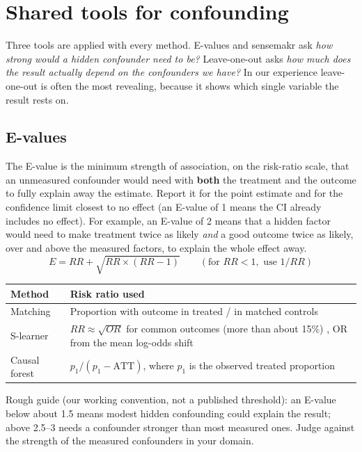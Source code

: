 \section{Shared tools for confounding}\label{sec:shared}

Three tools are applied with every method. E-values and sensemakr ask \emph{how strong would a hidden confounder need to be?} Leave-one-out asks \emph{how much does the result actually depend on the confounders we have?} In our experience leave-one-out is often the most revealing, because it shows which single variable the result rests on.

\subsection{E-values}

The E-value \cite{vanderweele2017evalue} is the minimum strength of association, on the risk-ratio scale, that an unmeasured confounder would need with \textbf{both} the treatment and the outcome to fully explain away the estimate. Report it for the point estimate and for the confidence limit closest to no effect (an E-value of 1 means the CI already includes no effect). For example, an E-value of 2 means that a hidden factor would need to make treatment twice as likely \emph{and} a good outcome twice as likely, over and above the measured factors, to explain the whole effect away.
\[ E = RR + \sqrt{RR \times (RR - 1)} \qquad (\text{for } RR < 1, \text{ use } 1/RR) \]

\begin{xltabular}{\textwidth}{L{3.4cm}Y}
\toprule
\textbf{Method} & \textbf{Risk ratio used} \\
\midrule
Matching & Proportion with outcome in treated / in matched controls \\
S-learner & $RR \approx \sqrt{OR}$ for common outcomes (more than about 15\%) \cite{vanderweele2017sqrt}, OR from the mean log-odds shift \\
Causal forest & $p_1 / (p_1 - \mathrm{ATT})$, where $p_1$ is the observed treated proportion \\
\bottomrule
\end{xltabular}

Rough guide (our working convention, not a published threshold): an E-value below about 1.5 means modest hidden confounding could explain the result; above 2.5--3 needs a confounder stronger than most measured ones. Judge against the strength of the measured confounders in your domain.

